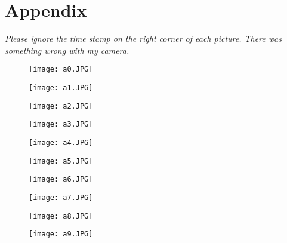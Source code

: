 \documentclass[12pt,fleqn]{article}
\begin{document}
\section{Appendix}
\emph{Please ignore the time stamp on the right corner of each picture. There was something wrong with my camera.} 
\begin{multicols}{2}
\begin{figure}[H]
\texttt{[image: a0.JPG]}
\end{figure}
\begin{figure}[H]
\texttt{[image: a1.JPG]}
\end{figure}
\begin{figure}[H]
\texttt{[image: a2.JPG]}
\end{figure}
\begin{figure}[H]
\texttt{[image: a3.JPG]}
\end{figure}
\begin{figure}[H]
\texttt{[image: a4.JPG]}
\end{figure}
\begin{figure}[H]
\texttt{[image: a5.JPG]}
\end{figure}
\begin{figure}[H]
\texttt{[image: a6.JPG]}
\end{figure}
\begin{figure}[H]
\texttt{[image: a7.JPG]}
\end{figure}
\begin{figure}[H]
\texttt{[image: a8.JPG]}
\end{figure}
\begin{figure}[H]
\texttt{[image: a9.JPG]}
\end{figure}
\end{multicols}
\end{document}
